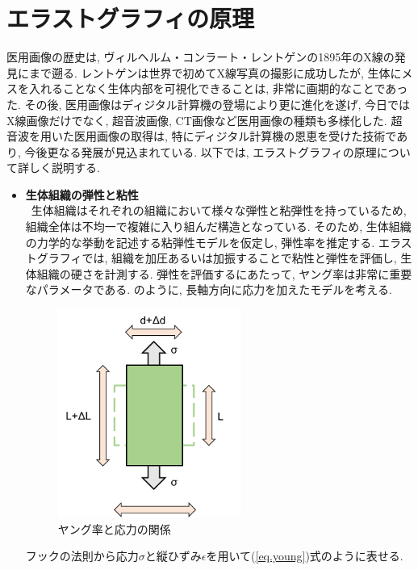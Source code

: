 \section{エラストグラフィの原理}
医用画像の歴史は, ヴィルヘルム・コンラート・レントゲンの1895年のX線の発見にまで遡る. レントゲンは世界で初めてX線写真の撮影に成功したが,  生体にメスを入れることなく生体内部を可視化できることは, 非常に画期的なことであった. その後, 医用画像はディジタル計算機の登場により更に進化を遂げ, 今日ではX線画像だけでなく, 超音波画像, CT画像など医用画像の種類も多様化した. 超音波を用いた医用画像の取得は, 特にディジタル計算機の恩恵を受けた技術であり, 今後更なる発展が見込まれている. 以下では, エラストグラフィの原理について詳しく説明する. %
\begin{itemize}
\item{\bf 生体組織の弾性と粘性}\cite{elastography2}
\\\ 生体組織はそれぞれの組織において様々な弾性と粘弾性を持っているため, 組織全体は不均一で複雑に入り組んだ構造となっている. そのため, 生体組織の力学的な挙動を記述する粘弾性モデルを仮定し, 弾性率を推定する.%
エラストグラフィでは, 組織を加圧あるいは加振することで粘性と弾性を評価し, 生体組織の硬さを計測する. 弾性を評価するにあたって, ヤング率は非常に重要なパラメータである. のように, 長軸方向に応力を加えたモデルを考える. 
\begin{figure}[H]
  \begin{center}
    \includegraphics[width=60mm]{fig/young.pdf}
  \end{center}
  \caption{ヤング率と応力の関係}
\end{figure}
フックの法則から応力$\sigma$と縦ひずみ$\epsilon$を用いて(\ref{eq.young})式のように表せる. 
\begin{equation}

\end{equation}
\end{itemize}
